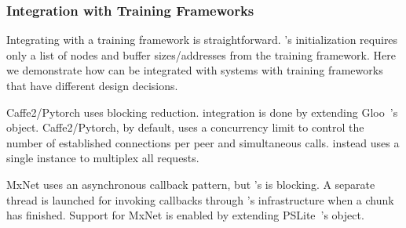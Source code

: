 
\subsubsection{Integration with Training Frameworks}
\label{sec:integration}
Integrating \plink with a training framework is straightforward. \plink{}'s initialization requires only a list of nodes and buffer sizes/addresses from the training framework. %
Here we demonstrate how \plink can be integrated with systems with training frameworks that have different design decisions.

Caffe2/Pytorch uses blocking reduction. \plink integration is done by extending Gloo~\cite{facebook35:online}'s  object. Caffe2/Pytorch, by default, uses a concurrency limit to control the number of established connections per peer and simultaneous  calls. \plink instead uses a single \ha instance to multiplex all requests.

MxNet uses an asynchronous callback pattern, but \plink{}'s  is blocking. A separate thread is launched for invoking callbacks through 's infrastructure when a chunk has finished. Support for MxNet is enabled by extending PSLite~\cite{dmlcpsli50:online}'s  object. %

